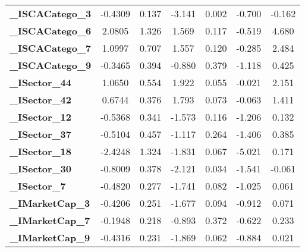 \begin{table}[H]
\begin{center}
\begin{tabular}{lcccccc}
\textbf{\_ISCACatego\_3}               &      -0.4309  &        0.137     &    -3.141  &         0.002        &       -0.700    &       -0.162     \\
\textbf{\_ISCACatego\_6}               &       2.0805  &        1.326     &     1.569  &         0.117        &       -0.519    &        4.680     \\
\textbf{\_ISCACatego\_7}               &       1.0997  &        0.707     &     1.557  &         0.120        &       -0.285    &        2.484     \\
\textbf{\_ISCACatego\_9}               &      -0.3465  &        0.394     &    -0.880  &         0.379        &       -1.118    &        0.425     \\
\textbf{\_ISector\_44}                 &       1.0650  &        0.554     &     1.922  &         0.055        &       -0.021    &        2.151     \\
\textbf{\_ISector\_42}                 &       0.6744  &        0.376     &     1.793  &         0.073        &       -0.063    &        1.411     \\
\textbf{\_ISector\_12}                 &      -0.5368  &        0.341     &    -1.573  &         0.116        &       -1.206    &        0.132     \\
\textbf{\_ISector\_37}                 &      -0.5104  &        0.457     &    -1.117  &         0.264        &       -1.406    &        0.385     \\
\textbf{\_ISector\_18}                 &      -2.4248  &        1.324     &    -1.831  &         0.067        &       -5.021    &        0.171     \\
\textbf{\_ISector\_30}                 &      -0.8009  &        0.378     &    -2.121  &         0.034        &       -1.541    &       -0.061     \\
\textbf{\_ISector\_7}                  &      -0.4820  &        0.277     &    -1.741  &         0.082        &       -1.025    &        0.061     \\
\textbf{\_IMarketCap\_3}               &      -0.4206  &        0.251     &    -1.677  &         0.094        &       -0.912    &        0.071     \\
\textbf{\_IMarketCap\_7}               &      -0.1948  &        0.218     &    -0.893  &         0.372        &       -0.622    &        0.233     \\
\textbf{\_IMarketCap\_9}               &      -0.4316  &        0.231     &    -1.869  &         0.062        &       -0.884    &        0.021     \\

\end{tabular}
\end{center}
\end{table}
